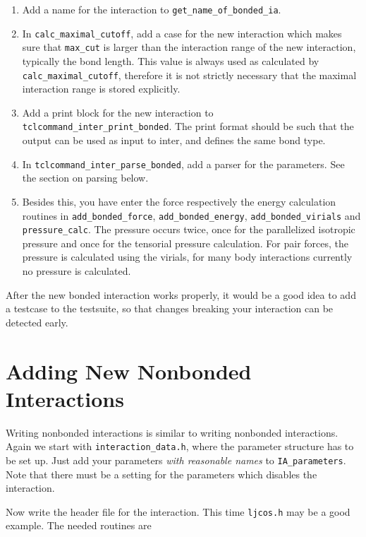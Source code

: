 \documentclass[
a4paper,                        %
11pt,                           %
twoside,                        %
footsepline,                    %
headsepline,                    %
headexclude,                    %
footexclude,                    %
pagesize,                       %
bibtotocnumbered,               %
idxtotoc                        %
]{scrreprt}
\begin{document}
\begin{enumerate}
\item Add a name for the interaction to \verb!get_name_of_bonded_ia!.
\item In \verb!calc_maximal_cutoff!, add a case for the new
  interaction which makes sure that \verb!max_cut! is larger than the
  interaction range of the new interaction, typically the bond
  length. This value is always used as calculated by
  \verb!calc_maximal_cutoff!, therefore it is not strictly necessary
  that the maximal interaction range is stored explicitly.
\item Add a print block for the new interaction to
  \verb!tclcommand_inter_print_bonded!. The print format should be
  such that the output can be used as input to inter, and defines the
  same bond type.
\item In \verb!tclcommand_inter_parse_bonded!,
  add a parser for the parameters. See the section on parsing below.
\item Besides this, you have enter the force respectively the energy
  calculation routines in \verb!add_bonded_force!,
  \verb!add_bonded_energy!, \verb!add_bonded_virials! and
  \verb!pressure_calc!. The pressure occurs twice, once for the
  parallelized isotropic pressure and once for the tensorial pressure
  calculation. For pair forces, the pressure is calculated using the
  virials, for many body interactions currently no pressure is
  calculated.
\end{enumerate}

After the new bonded interaction works properly, it would be a good
idea to add a testcase to the testsuite, so that changes breaking your
interaction can be detected early.

\section{Adding New Nonbonded Interactions}

Writing nonbonded interactions is similar to writing nonbonded
interactions. Again we start with \verb!interaction_data.h!, where the
parameter structure has to be set up. Just add your parameters
\emph{with reasonable names} to \verb!IA_parameters!. Note that there
must be a setting for the parameters which disables the interaction.

Now write the header file for the interaction. This time
\verb!ljcos.h! may be a good example. The needed routines are
\end{document}
